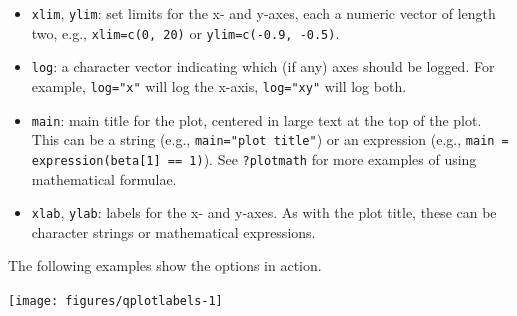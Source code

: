 \begin{itemize}
\itemsep1pt\parskip0pt
\item
  \texttt{xlim}, \texttt{ylim}: set limits for the x- and y-axes, each a
  numeric vector of length two, e.g., \texttt{xlim=c(0, 20)} or
  \texttt{ylim=c(-0.9, -0.5)}. 
\item
  \texttt{log}: a character vector indicating which (if any) axes should
  be logged. For example, \texttt{log="x"} will log the x-axis,
  \texttt{log="xy"} will log both.
\item
  \texttt{main}: main title for the plot, centered in large text at the
  top of the plot. This can be a string (e.g.,
  \texttt{main="plot title"}) or an expression (e.g.,
  \texttt{main = expression(beta{[}1{]} == 1)}). See \texttt{?plotmath}
  for more examples of using mathematical formulae. 
\item
  \texttt{xlab}, \texttt{ylab}: labels for the x- and y-axes. As with
  the plot title, these can be character strings or mathematical
  expressions. 
\end{itemize}

The following examples show the options in action.

\begin{Shaded}
\begin{Highlighting}[]
\NormalTok{>}\StringTok{ }\NormalTok{(}
\NormalTok{+}\StringTok{   } 
\NormalTok{+}\StringTok{   } \NormalTok{, } \NormalTok{,  }
\NormalTok{+}\StringTok{   } 
\NormalTok{+}\StringTok{ }\NormalTok{)}
\end{Highlighting}
\end{Shaded}

\begin{flushleft}\texttt{[image: figures/qplotlabels-1]} \end{flushleft}

\begin{Shaded}
\begin{Highlighting}[]
\NormalTok{>}\StringTok{ }\NormalTok{(}
\NormalTok{+}\StringTok{    } 
\NormalTok{+}\StringTok{    } \NormalTok{(}
\NormalTok{+}\StringTok{    } \NormalTok{,  }
\NormalTok{+}\StringTok{    } \NormalTok{, }
\NormalTok{+}\StringTok{    } \NormalTok{,}\NormalTok{)}
\NormalTok{+}\StringTok{ }\NormalTok{)}
\end{Highlighting}
\end{Shaded}

